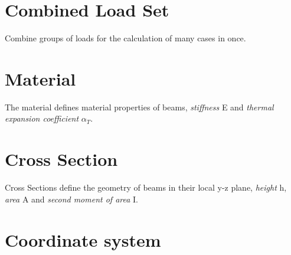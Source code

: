 \documentclass[a4paper,11pt]{report}
\begin{document}
\section{Combined Load Set}
Combine groups of loads for the calculation of many cases in once.

\section{Material}
The material defines material properties of beams, \textit{stiffness} E and \textit{thermal expansion coefficient} $\alpha_T$.

\section{Cross Section}
Cross Sections define the geometry of beams in their local y-z plane,  \textit{height} h, \textit{area} A and \textit{second moment of area} I.


\section{Coordinate system}
\end{document}
